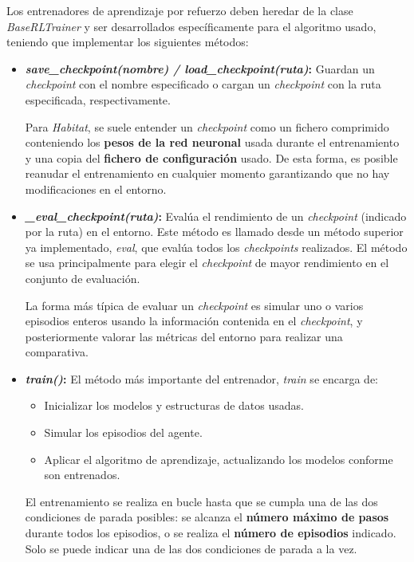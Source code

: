 Los entrenadores de aprendizaje por refuerzo deben heredar de la clase \textit{BaseRLTrainer} y ser desarrollados específicamente para el algoritmo usado, teniendo que implementar los siguientes métodos:

\begin{itemize}
	\item \textbf{\textit{save{\_}checkpoint(nombre) / load{\_}checkpoint(ruta)}:} Guardan un \textit{checkpoint} con el nombre especificado o cargan un \textit{checkpoint} con la ruta especificada, respectivamente.
	
	Para \textit{Habitat}, se suele entender un \textit{checkpoint} como un fichero comprimido conteniendo los \textbf{pesos de la red neuronal} usada durante el entrenamiento y una copia del \textbf{fichero de configuración} usado. De esta forma, es posible reanudar el entrenamiento en cualquier momento garantizando que no hay modificaciones en el entorno.
	
	\item \textbf{\textit{{\_}eval{\_}checkpoint(ruta)}:} Evalúa el rendimiento de un \textit{checkpoint} (indicado por la ruta) en el entorno. Este método es llamado desde un método superior ya implementado, \textit{eval}, que evalúa todos los \textit{checkpoints} realizados. El método se usa principalmente para elegir el \textit{checkpoint} de mayor rendimiento en el conjunto de evaluación.
	
	La forma más típica de evaluar un \textit{checkpoint} es simular uno o varios episodios enteros usando la información contenida en el \textit{checkpoint}, y posteriormente valorar las métricas del entorno para realizar una comparativa. 

	\item \textbf{\textit{train()}:} El método más importante del entrenador, \textit{train} se encarga de:
	\begin{itemize}
		\item Inicializar los modelos y estructuras de datos usadas.
		\item Simular los episodios del agente.
		\item Aplicar el algoritmo de aprendizaje, actualizando los modelos conforme son entrenados.
	\end{itemize}
	
	El entrenamiento se realiza en bucle hasta que se cumpla una de las dos condiciones de parada posibles: se alcanza el \textbf{número máximo de pasos} durante todos los episodios, o se realiza el \textbf{número de episodios} indicado. Solo se puede indicar una de las dos condiciones de parada a la vez.
	

\end{itemize}
